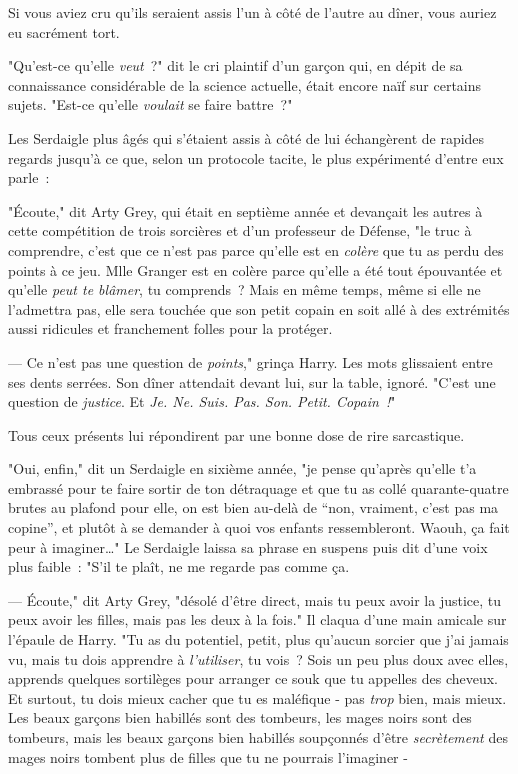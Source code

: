 \later

Si vous aviez cru qu'ils seraient assis l'un à côté de l'autre au dîner, vous auriez eu sacrément tort.

"Qu'est-ce qu'elle \emph{veut}~?" dit le cri plaintif d'un garçon qui, en dépit de sa connaissance considérable de la science actuelle, était encore naïf sur certains sujets. "Est-ce qu'elle \emph{voulait} se faire battre~?"

Les Serdaigle plus âgés qui s'étaient assis à côté de lui échangèrent de rapides regards jusqu'à ce que, selon un protocole tacite, le plus expérimenté d'entre eux parle~:

"Écoute," dit Arty Grey, qui était en septième année et devançait les autres à cette compétition de trois sorcières et d'un professeur de Défense, "le truc à comprendre, c'est que ce n'est pas parce qu'elle est en \emph{colère} que tu as perdu des points à ce jeu. Mlle Granger est en colère parce qu'elle a été tout épouvantée et qu'elle \emph{peut te blâmer}, tu comprends~? Mais en même temps, même si elle ne l'admettra pas, elle sera touchée que son petit copain en soit allé à des extrémités aussi ridicules et franchement folles pour la protéger.

--- Ce n'est pas une question de \emph{points}," grinça Harry. Les mots glissaient entre ses dents serrées. Son dîner attendait devant lui, sur la table, ignoré. "C'est une question de \emph{justice}. Et \emph{Je. Ne. Suis. Pas. Son. Petit. Copain~!}"

Tous ceux présents lui répondirent par une bonne dose de rire sarcastique.

"Oui, enfin," dit un Serdaigle en sixième année, "je pense qu'après qu'elle t'a embrassé pour te faire sortir de ton détraquage et que tu as collé quarante-quatre brutes au plafond pour elle, on est bien au-delà de “non, vraiment, c'est pas ma copine”, et plutôt à se demander à quoi vos enfants ressembleront. Waouh, ça fait peur à imaginer…" Le Serdaigle laissa sa phrase en suspens puis dit d'une voix plus faible~: "S'il te plaît, ne me regarde pas comme ça.

--- Écoute," dit Arty Grey, "désolé d'être direct, mais tu peux avoir la justice, tu peux avoir les filles, mais pas les deux à la fois." Il claqua d'une main amicale sur l'épaule de Harry. "Tu as du potentiel, petit, plus qu'aucun sorcier que j'ai jamais vu, mais tu dois apprendre à \emph{l'utiliser}, tu vois~? Sois un peu plus doux avec elles, apprends quelques sortilèges pour arranger ce souk que tu appelles des cheveux. Et surtout, tu dois mieux cacher que tu es maléfique - pas \emph{trop} bien, mais mieux. Les beaux garçons bien habillés sont des tombeurs, les mages noirs sont des tombeurs, mais les beaux garçons bien habillés soupçonnés d'être \emph{secrètement} des mages noirs tombent plus de filles que tu ne pourrais l'imaginer -

